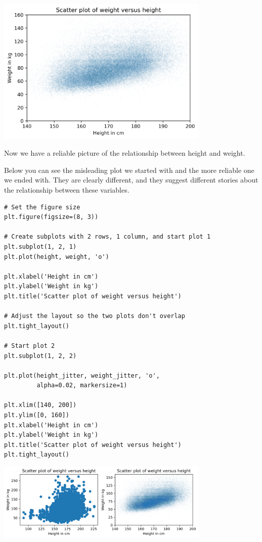 \begin{center}
\includegraphics[width=4in]{chapters/09_relationships_files/09_relationships_26_0.png}
\end{center}

Now we have a reliable picture of the relationship between height and
weight.

Below you can see the misleading plot we started with and the more
reliable one we ended with. They are clearly different, and they suggest
different stories about the relationship between these variables.

\begin{lstlisting}[]
# Set the figure size
plt.figure(figsize=(8, 3))

# Create subplots with 2 rows, 1 column, and start plot 1
plt.subplot(1, 2, 1)
plt.plot(height, weight, 'o')

plt.xlabel('Height in cm')
plt.ylabel('Weight in kg')
plt.title('Scatter plot of weight versus height')

# Adjust the layout so the two plots don't overlap
plt.tight_layout()

# Start plot 2
plt.subplot(1, 2, 2)

plt.plot(height_jitter, weight_jitter, 'o', 
         alpha=0.02, markersize=1)

plt.xlim([140, 200])
plt.ylim([0, 160])
plt.xlabel('Height in cm')
plt.ylabel('Weight in kg')
plt.title('Scatter plot of weight versus height')
plt.tight_layout()
\end{lstlisting}

\begin{center}
\includegraphics[width=4in]{chapters/09_relationships_files/09_relationships_28_0.png}
\end{center}

